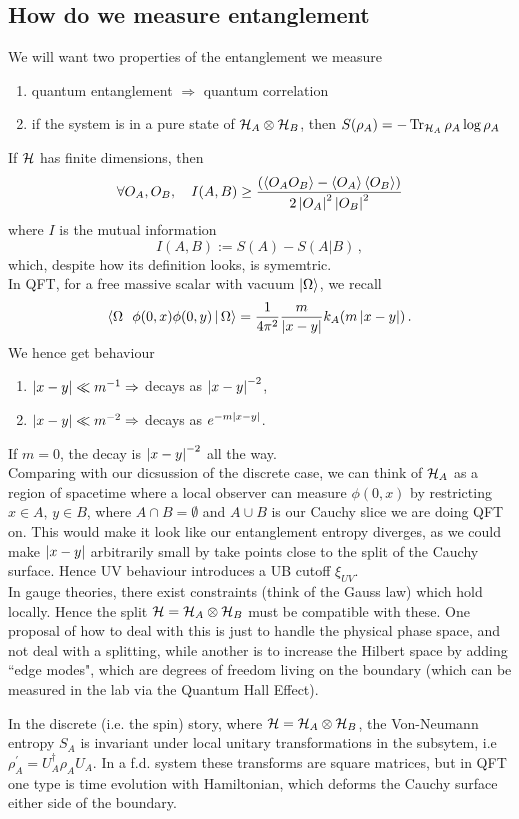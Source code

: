 \documentclass{article}
\begin{document}
\subsection{How do we measure entanglement}
We will want two properties of the entanglement we measure
\begin{enumerate}
	\item quantum entanglement $\Rightarrow$ quantum correlation
	\item if the system is in a pure state of $\mathcal{H}_A \otimes \mathcal{H}_B$, then $S(\rho_A) = - \operatorname{Tr}_{\mathcal{H}_A} \rho_A \log \rho_A$
\end{enumerate}
If $\mathcal{H}$ has finite dimensions, then 
\[
\forall O_A, O_B , \quad I(A, B) \geq \frac{\left( \left\langle O_A O_B \right\rangle - \left\langle O_A \right\rangle \left\langle O_B \right\rangle \right)}{2 \left\lvert O_A \right\rvert^2 \left\lvert O_B \right\rvert^2}
\]
where $I$ is the mutual information 
\[
I(A,B) := S(A) -S(A | B) \, , 
\]
which, despite how its definition looks, is symemtric. \\
In QFT, for a free massive scalar with vacuum $\ket{\Omega}$, we recall 
\[
\left\langle \Omega \, \ \, \phi(0,x) \phi(0,y) \, | \, \Omega \right\rangle = \frac{1}{4 \pi^2} \frac{m}{\left\lvert x-y \right\rvert} k_A (m\left\lvert x-y \right\rvert) \, .
\]
We hence get behaviour 
\begin{enumerate}
	\item $\left\lvert x-y \right\rvert \ll m^{-1} \Rightarrow $ decays as $\left\lvert x-y \right\rvert^{-2}$, 
	\item $\left\lvert x-y \right\rvert \ll m^{-2} \Rightarrow $ decays as $e^{-m\left\lvert x-y \right\rvert}$.
\end{enumerate}
If $m=0$, the decay is $\left\lvert x-y \right\rvert^{-2}$ all the way. \\
Comparing with our dicsussion of the discrete case, we can think of $\mathcal{H}_A$ as a region of spacetime where a local observer can measure $\phi(0,x)$ by restricting $x \in A, \, y \in B$, where $A \cap B = \emptyset$ and $A \cup B$ is our Cauchy slice we are doing QFT on. This would make it look like our entanglement entropy diverges, as we could make $\left\lvert x-y \right\rvert$ arbitrarily small by take points close to the split of the Cauchy surface.  Hence UV behaviour introduces a UB cutoff $\xi_{UV}$. \\
In gauge theories, there exist constraints (think of the Gauss law) which hold locally. Hence the split $\mathcal{H} = \mathcal{H}_A \otimes \mathcal{H}_B$ must be compatible with these. One proposal of how to deal with this is just to handle the physical phase space, and not deal with a splitting, while another is to increase the Hilbert space by adding ``edge modes", which are degrees of freedom living on the boundary (which can be measured in the lab via the Quantum Hall Effect).  
\begin{remark}
	In the discrete (i.e. the spin) story, where $\mathcal{H} = \mathcal{H}_A \otimes \mathcal{H}_B$, the Von-Neumann entropy $S_A$ is invariant under local unitary transformations in the subsytem, i.e $\rho_A^\prime = U_A^\dagger \rho_A U_A $. In a f.d. system these transforms are square matrices, but in QFT one type is time evolution with Hamiltonian, which deforms the Cauchy surface either side of the boundary. 
\end{remark}
\end{document}
